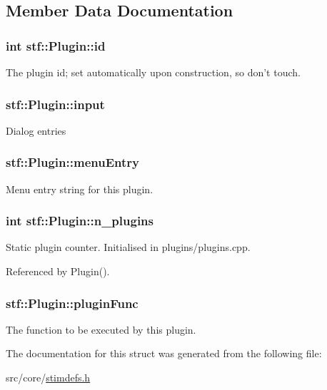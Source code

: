 \subsection{Member Data Documentation}
\hypertarget{structstf_1_1Plugin_a417ea89eae1a8fbd21e7c7488d14fd7d}{
\subsubsection[{id}]{\setlength{\rightskip}{0pt plus 5cm}int {\bf stf::Plugin::id}}}
\label{structstf_1_1Plugin_a417ea89eae1a8fbd21e7c7488d14fd7d}
The plugin id; set automatically upon construction, so don't touch. \hypertarget{structstf_1_1Plugin_a53713a074aabf4d0e873d9d13b1e60f3}{
\subsubsection[{input}]{ {\bf stf::Plugin::input}}}
\label{structstf_1_1Plugin_a53713a074aabf4d0e873d9d13b1e60f3}
Dialog entries \hypertarget{structstf_1_1Plugin_a9e7060c1a895ba6ea04250c2c1313272}{
\subsubsection[{menuEntry}]{ {\bf stf::Plugin::menuEntry}}}
\label{structstf_1_1Plugin_a9e7060c1a895ba6ea04250c2c1313272}
Menu entry string for this plugin. \hypertarget{structstf_1_1Plugin_a41eba3414a715e63c4dfff9fc2d53851}{
\subsubsection[{n\_\-plugins}]{\setlength{\rightskip}{0pt plus 5cm}int {\bf stf::Plugin::n\_\-plugins}}}
\label{structstf_1_1Plugin_a41eba3414a715e63c4dfff9fc2d53851}
Static plugin counter. Initialised in plugins/plugins.cpp. 

Referenced by Plugin().

\hypertarget{structstf_1_1Plugin_aebef99c1f1bd1d6c69ff8fb31988d22d}{
\subsubsection[{pluginFunc}]{ {\bf stf::Plugin::pluginFunc}}}
\label{structstf_1_1Plugin_aebef99c1f1bd1d6c69ff8fb31988d22d}
The function to be executed by this plugin. 

The documentation for this struct was generated from the following file:\begin{DoxyCompactItemize}
\item 
src/core/\hyperlink{stimdefs_8h}{stimdefs.h}\end{DoxyCompactItemize}
